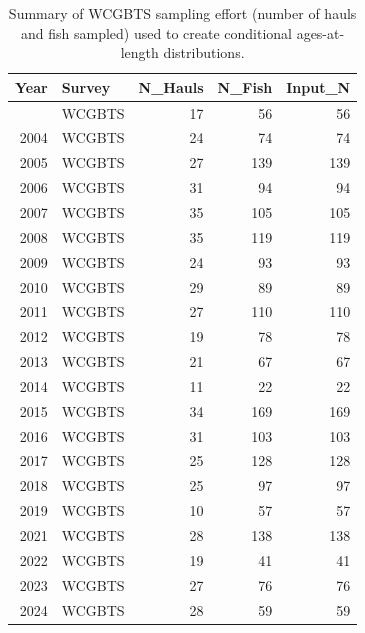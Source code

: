 \documentclass[
]{scrartcl}
\begin{document}
\endgroup

\newpage{}

\begingroup
\fontsize{9.0pt}{10.8pt}\selectfont

\begin{longtable}{rlrrr}

\caption{\label{tbl-survey_age_samples}Summary of WCGBTS sampling effort
(number of hauls and fish sampled) used to create conditional
ages-at-length distributions.}

\tabularnewline

\toprule
Year & Survey & N\_Hauls & N\_Fish & Input\_N \\ 
\midrule\addlinespace[2.5pt]
2003 & WCGBTS & 17 & 56 & 56 \\ 
2004 & WCGBTS & 24 & 74 & 74 \\ 
2005 & WCGBTS & 27 & 139 & 139 \\ 
2006 & WCGBTS & 31 & 94 & 94 \\ 
2007 & WCGBTS & 35 & 105 & 105 \\ 
2008 & WCGBTS & 35 & 119 & 119 \\ 
2009 & WCGBTS & 24 & 93 & 93 \\ 
2010 & WCGBTS & 29 & 89 & 89 \\ 
2011 & WCGBTS & 27 & 110 & 110 \\ 
2012 & WCGBTS & 19 & 78 & 78 \\ 
2013 & WCGBTS & 21 & 67 & 67 \\ 
2014 & WCGBTS & 11 & 22 & 22 \\ 
2015 & WCGBTS & 34 & 169 & 169 \\ 
2016 & WCGBTS & 31 & 103 & 103 \\ 
2017 & WCGBTS & 25 & 128 & 128 \\ 
2018 & WCGBTS & 25 & 97 & 97 \\ 
2019 & WCGBTS & 10 & 57 & 57 \\ 
2021 & WCGBTS & 28 & 138 & 138 \\ 
2022 & WCGBTS & 19 & 41 & 41 \\ 
2023 & WCGBTS & 27 & 76 & 76 \\ 
2024 & WCGBTS & 28 & 59 & 59 \\ 
\bottomrule

\end{longtable}

\endgroup

\newpage{}

\begingroup
\fontsize{9.0pt}{10.8pt}\selectfont
\end{document}
